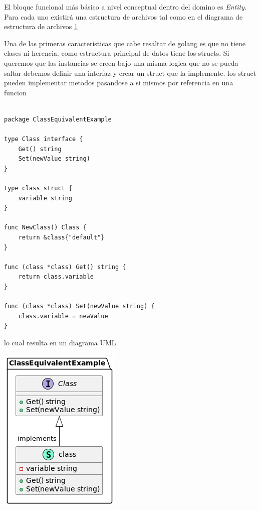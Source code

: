 El bloque funcional más básico a nivel conceptual dentro del domino es \textit{Entity}. Para cada uno existirá una estructura de archivos tal como en el diagrama de estructura de archivos \ref{fig:folderEntity}

\begin{figure}[h]
    \caption{}
    \label{fig:folderEntity}
\end{figure}

Una de las primeras características que cabe resaltar de golang es que no tiene clases ni herencia. como estructura
principal de datos tiene los structs. Si queremos que las instancias se creen bajo una misma logica que no se pueda saltar
debemos definir una interfaz y crear un struct que la implemente. los struct pueden implementar metodos pasandose a si mismos por referencia en una funcion

\begin{lstlisting}[label={lst:lstlisting}]

package ClassEquivalentExample

type Class interface {
	Get() string
	Set(newValue string)
}

type class struct {
	variable string
}

func NewClass() Class {
	return &class{"default"}
}

func (class *class) Get() string {
	return class.variable
}

func (class *class) Set(newValue string) {
	class.variable = newValue
}

\end{lstlisting}

lo cual resulta en un diagrama UML

\includegraphics{part/memoria_descriptiva/ClassEquivalentInGolang}

